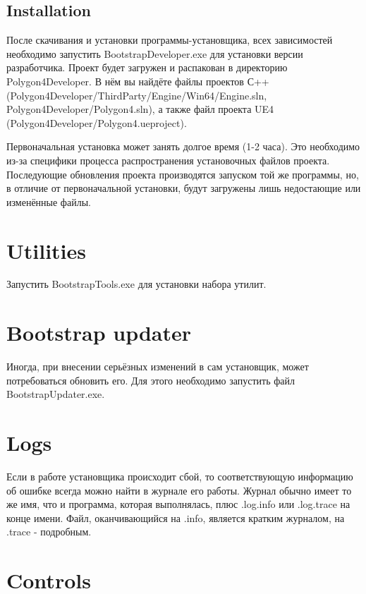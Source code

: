 \documentclass[a4paper,12pt]{report}
\newcommand{\ue}{UE4\xspace}
\begin{document}
\subsection{Installation}

После скачивания и установки программы-установщика, всех зависимостей необходимо запустить BootstrapDeveloper.exe для установки версии разработчика.
Проект будет загружен и распакован в директорию \\Polygon4Developer.
В нём вы найдёте файлы проектов С++ \\(Polygon4Developer/ThirdParty/Engine/Win64/Engine.sln,\\ Polygon4Developer/Polygon4.sln), а также файл проекта \ue\\ (Polygon4Developer/Polygon4.ueproject).

Первоначальная установка может занять долгое время (1-2 часа).
Это необходимо из-за специфики процесса распространения установочных файлов проекта.
Последующие обновления проекта производятся запуском той же программы, но, в отличие от первоначальной установки, будут загружены лишь недостающие или изменённые файлы.


\section{Utilities}

Запустить BootstrapTools.exe для установки набора утилит.


\section{Bootstrap updater}

Иногда, при внесении серьёзных изменений в сам установщик, может потребоваться обновить его.
Для этого необходимо запустить файл BootstrapUpdater.exe.

\section{Logs}

Если в работе установщика происходит сбой, то соответствующую информацию об ошибке всегда можно найти в журнале его работы.
Журнал обычно имеет то же имя, что и программа, которая выполнялась, плюс .log.info или .log.trace на конце имени.
Файл, оканчивающийся на .info, является кратким журналом, на .trace - подробным.

\section{Controls}
\end{document}
